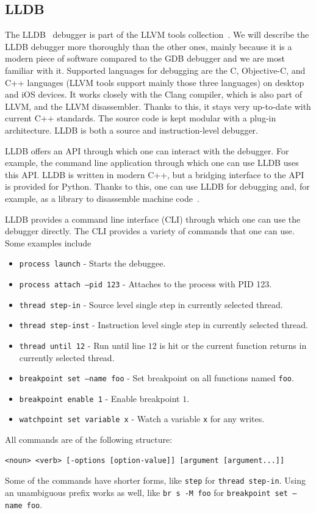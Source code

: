 \subsection{LLDB}\label{section:case-study}
The LLDB~\cite{lldb} debugger is part of the LLVM tools collection~\cite{llvm}.
We will describe the LLDB debugger more thoroughly than the other ones, mainly
because it is a modern piece of software compared to the GDB debugger and we
are most familiar with it. Supported languages for debugging are the C,
Objective-C, and C++ languages (LLVM tools support mainly those three
languages) on desktop and iOS devices. It works closely with the Clang
compiler, which is also part of LLVM, and the LLVM disassembler. Thanks to
this, it stays very up-to-date with current C++ standards. The source code is
kept modular with a plug-in architecture. LLDB is both a source and
instruction-level debugger.

LLDB offers an API through which one can interact with the debugger. For
example, the command line application through which one can use LLDB uses this
API. LLDB is written in modern C++, but a bridging interface to the API is
provided for Python. Thanks to this, one can use LLDB for debugging and, for
example, as a library to disassemble machine code~\cite{lldb}.

LLDB provides a command line interface (CLI) through which one can use the
debugger directly. The CLI provides a variety of commands that one can use.
Some examples include
\begin{itemize}
    \item \texttt{process launch} - Starts the debuggee.
    \item \texttt{process attach --pid 123} - Attaches to the process with PID
        123.
    \item \texttt{thread step-in} - Source level single step in currently selected thread.
    \item \texttt{thread step-inst} - Instruction level single step in currently selected thread.
    \item \texttt{thread until 12} - Run until line $12$ is hit or the current
        function returns in currently selected thread.
    \item \texttt{breakpoint set --name foo} - Set breakpoint on all functions
        named \texttt{foo}.
    \item \texttt{breakpoint enable 1} - Enable breakpoint $1$.
    \item \texttt{watchpoint set variable x} - Watch a variable \texttt{x} for
        any writes.
\end{itemize}
All commands are of the following structure:
\begin{lstlisting}
<noun> <verb> [-options [option-value]] [argument [argument...]]
\end{lstlisting}
Some of the commands have shorter forms, like \texttt{step} for \texttt{thread
step-in}. Using an unambiguous prefix works as well, like \texttt{br s -M foo}
for \texttt{breakpoint set --name foo}.

